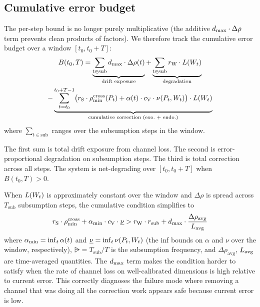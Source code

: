 \subsection{Cumulative error budget}

The per-step bound is no longer purely multiplicative (the additive
$d_{\mathrm{max}} \cdot \Delta\rho$ term prevents clean products of factors).
We therefore track the cumulative error budget over a window
$[t_0, t_0 + T]$:
\begin{multline}
\label{eq:error_budget}
B(t_0, T) =
  \underbrace{\sum_{t \in \mathrm{sub}} d_{\mathrm{max}} \cdot \Delta\rho(t)}
    _{\text{drift exposure}}
  + \underbrace{\sum_{t \in \mathrm{sub}} r_{\mathrm{W}} \cdot L(W_t)}
    _{\text{degradation}} \\
  - \underbrace{\sum_{t=t_0}^{t_0+T-1}
    \bigl(r_{\mathrm{S}} \cdot \rho_{\min}^{\mathrm{cross}}(P_t)
    + \alpha(t) \cdot c_{\mathrm{V}} \cdot \nu(P_t, W_t)\bigr) \cdot
    L(W_t)}_{\text{cumulative correction (exo.\ + endo.)}}
\end{multline}
where $\sum_{t \in \mathrm{sub}}$ ranges over the subsumption steps in
the window.

The first sum is total drift exposure from channel loss.  The second is
error-proportional degradation on subsumption steps.  The third is total
correction across all steps.  The system is net-degrading over
$[t_0, t_0 + T]$ when $B(t_0, T) > 0$.

\begin{remark}
\label{rem:linearized}
When $L(W_t)$ is approximately constant over the window and
$\Delta\rho$ is spread across $T_{\mathrm{sub}}$ subsumption steps, the
cumulative condition simplifies to
\begin{equation}
\label{eq:linearized}
r_{\mathrm{S}} \cdot \rho_{\min}^{\mathrm{cross}} + \alpha_{\min} \cdot c_{\mathrm{V}} \cdot \underline{\nu}
  > r_{\mathrm{W}} \cdot r_{\mathrm{sub}}
  + d_{\mathrm{max}} \cdot \frac{\Delta\rho_{\mathrm{avg}}}{L_{\mathrm{avg}}}
\end{equation}
where $\alpha_{\min} = \inf_t \alpha(t)$ and
$\underline{\nu} = \inf_t \nu(P_t, W_t)$ (the inf bounds on
$\alpha$ and $\nu$ over the window, respectively),
$\rsub = T_{\mathrm{sub}} / T$ is the subsumption frequency, and
$\Delta\rho_{\mathrm{avg}}$, $L_{\mathrm{avg}}$ are time-averaged
quantities.  The $d_{\mathrm{max}}$ term makes the condition harder to satisfy
when the rate of channel loss on well-calibrated dimensions is high
relative to current error.  This correctly diagnoses the failure mode
where removing a channel that was doing all the correction work
appears safe because current error is low.
\end{remark}

